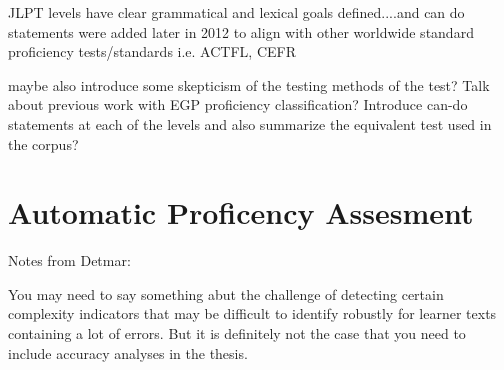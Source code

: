 JLPT levels have clear grammatical and lexical goals defined....and can do statements were added later in 2012 to
align with other worldwide standard proficiency tests/standards i.e. ACTFL, CEFR

maybe also introduce some skepticism of the testing methods of the test?
Talk about previous work with EGP proficiency classification?
Introduce can-do statements at each of the levels and also summarize the equivalent test used in the corpus?


\section{Automatic Proficency Assesment}


Notes from Detmar:


You may need to say something abut the challenge of detecting certain
complexity indicators that may be difficult to identify robustly for
learner texts containing a lot of errors. But it is definitely not the
case that you need to include accuracy analyses in the thesis.

